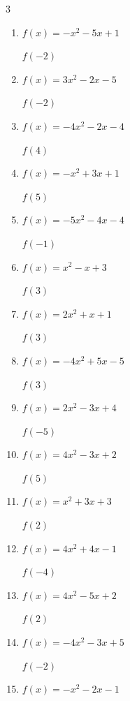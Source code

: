 \begin{multicols}{3}
\begin{enumerate}
  \item $f(x)=-x^{2}-5x+1$

$f(-2)$
        \phantom{$= 7$}

  \item $f(x)=3x^{2}-2x-5$

$f(-2)$
        \phantom{$= 11$}

  \item $f(x)=-4x^{2}-2x-4$

$f(4)$
        \phantom{$= -76$}

  \item $f(x)=-x^{2}+3x+1$

$f(5)$
        \phantom{$= -9$}

  \item $f(x)=-5x^{2}-4x-4$

$f(-1)$
        \phantom{$= -5$}

  \item $f(x)=x^{2}-x+3$

$f(3)$
        \phantom{$= 9$}

  \item $f(x)=2x^{2}+x+1$

$f(3)$
        \phantom{$= 22$}

\columnbreak %

  \item $f(x)=-4x^{2}+5x-5$

$f(3)$
        \phantom{$= -26$}

  \item $f(x)=2x^{2}-3x+4$

$f(-5)$
        \phantom{$= 69$}

  \item $f(x)=4x^{2}-3x+2$

$f(5)$
        \phantom{$= 87$}

  \item $f(x)=x^{2}+3x+3$

$f(2)$
        \phantom{$= 13$}

  \item $f(x)=4x^{2}+4x-1$

$f(-4)$
        \phantom{$= 47$}

  \item $f(x)=4x^{2}-5x+2$

$f(2)$
        \phantom{$= 8$}

  \item $f(x)=-4x^{2}-3x+5$

$f(-2)$
        \phantom{$= -5$}

  \item $f(x)=-x^{2}-2x-1$


\end{enumerate}
\end{multicols}
